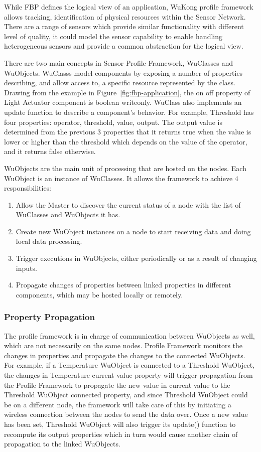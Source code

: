 While FBP defines the logical view of an application, WuKong profile framework allows
tracking, identification of physical resources within the Sensor Network.
There are a range of sensors which provide similar functionality with different
level of quality, it could model the sensor capability to enable handling
heterogeneous sensors and provide a common abstraction for the logical view.

There are two main concepts in Sensor Profile Framework, WuClasses and
WuObjects. WuClasss model components by exposing a number of properties
describing, and allow access to, a specific resource represented by the class.
Drawing from the example in Figure~\ref{fig:fbp-application}, the on off property of Light
Actuator component is boolean writeonly. WuClass also implements an update
function to describe a component's behavior. For
example, Threshold has four properties: operator, threshold, value, output. The
output value is determined from the previous 3 properties that it returns true
when the value is lower or higher than the threshold which depends on the value
of the operator, and it returns false otherwise.


WuObjects are the main unit of processing that are hosted on the nodes. Each
WuObject is an instance of WuClasses. It allows the framework to achieve
4 responsibilities:
\begin{enumerate}
\item Allow the Master to discover the current status of a node with the list
of WuClasses and WuObjects it has.
\item Create new WuObject instances on a node to start receiving data and doing
local data processing.
\item Trigger executions in WuObjects, either periodically or as a result of
changing inputs.
\item Propagate changes of properties between linked properties in different
components, which may be hosted locally or remotely.
\end{enumerate}

\subsubsection{Property Propagation}

The profile framework is in charge of communication between WuObjects as
well, which are not necessarily on the same nodes. Profile Framework monitors
the changes in properties and propagate the changes to the connected WuObjects.
For example, if a Temperature WuObject is connected to a Threshold WuObject,
the changes in Temperature current value property will trigger propagation from
the Profile Framework to propagate the new value in current value to the
Threshold WuObject connected property, and since Threshold WuObject could be on
a different node, the framework will take care of this by initiating
a wireless connection between the nodes to send the data over. Once a new value
has been set, Threshold WuObject will also trigger its update() function to
recompute its output properties which in turn would cause another chain of
propagation to the linked WuObjects.


